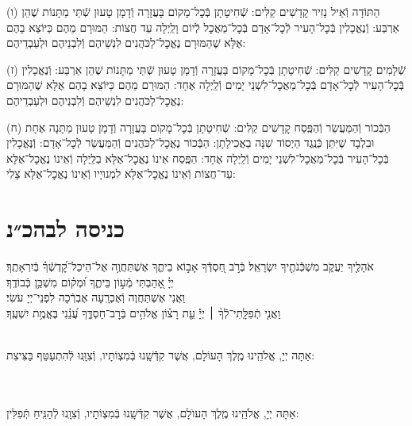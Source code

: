 \documentclass[twoside, openany, parskip=half, 11pt]{book}
\begin{document}
(ו) הַתּוֹדָה וְֿאֵיל נָזִיר קׇדָשִׁים קַלִּים: שְֿׁחִיטָתָן בְּֿכׇל־מָקוֹם בָּעֲזָרָה וְֿדָמָן טָעוּן שְֿׁתֵּי מַתָּנוֹת שֶׁהֵן אַרְבַּע: וְֿנֶאֱכָלִין בְּֿכׇל־הָעִיר לְֿכׇל־אָדָם בְּֿכׇל־מַאֲכׇל לְֿיוֹם וָלַֽיְלָה עַד חֲצוֹת: הַמּוּרָם מֵהֶם כַּיּוֹצֵא בָהֶם אֶלָּא שֶׁהַמּוּרָם נֶאֱכׇל־לַכֹּהֲנִים לִנְשֵׁיהֶם וְֿלִבְנֵיהֶם וּלְעַבְדֵיהֶם:

(ז) שְֿׁלָמִים קׇדָשִׁים קַלִּים: שְֿׁחִיטָתָן בְּֿכׇל־מָקוֹם בָּעֲזָרָה וְֿדָמָן טָעוּן שְֿׁתֵּי מַתָּנוֹת שֶׁהֵן אַרְבַּע: וְֿנֶאֱכָלִין בְּֿכׇל־הָעִיר לְֿכׇל־אָדָם בְּֿכׇל־מַאֲכׇל־לִשְׁנֵי יָמִים וְֿלַֽיְלָה אֶחָד: הַמּוּרָם מֵהֶם כַּיּוֹצֵא בָהֶם אֶלָּא שֶׁהַמּוּרָם נֶאֱכׇל־לַכֹּהֲנִים לִנְשֵׁיהֶם וְֿלִבְנֵיהֶם וּלְעַבְדֵיהֶם:

(ח) הַבְּֿכוֹר וְֿהַמַּעֲשֵׂר וְֿהַפֶּֽסַח קׇדָשִׁים קַלִּים: שְֿׁחִיטָתָן בְּֿכׇל־מָקוֹם בָּעֲזָרָה וְֿדָמָן טָעוּן מַתָּנָה אֶחָת וּבִלְבָד שֶׁיִּתֵּן כְּֿנֶֽגֶד הַיְסוֹד שִׁנָּה בַאֲכִילָתָן: הַבְּֿכוֹר נֶאֱכׇל־לַכֹּהֲנִים וְֿהַמַּעֲשֵׂר לְֿכׇל־אָדָם: וְֿנֶּאֱכָלִין בְּֿכׇל־הָעִיר בְּֿכׇל־מַאֲכׇל־לִשְׁנֵי יָמִים וְֿלַֽיְלָה אֶחָד: הַפֶּֽסַח אֵינוֹ נֶאֱכׇל־אֶלָּא בַלַּֽיְלָה וְֿאֵינוֹ נֶאֱכׇל־אֶלָּא עַד־חֲצוֹת וְֿאֵינוֹ נֶאֱכׇל־אֶלָּא לִמְנוּיָיו וְֿאֵינוֹ נֶאֱכׇל־אֶלָּא צָלִי:\\


\section[כניסה לבהכ״נ]{ כניסה לבהכ״נ }
אֹהָלֶ֖יךָ יַעֲקֹ֑ב מִשְׁכְּֿֿנֹתֶ֖יךָ יִשְׂרָאֵֽל׃
בְּֿרֹ֣ב חַ֭סְדְּֿֿךָ אָב֣וֹא בֵיתֶ֑ךָ אֶשְׁתַּחֲוֶ֥ה אֶל־הֵיכַל־קׇ֝דְשְֿׁךָ֗ בְּֿיִרְאָתֶֽךָ׃\\
יְיָ֗ אָ֭הַבְתִּי מְֿע֣וֹן בֵּיתֶ֑ךָ וּ֝מְק֗וֹם מִשְׁכַּ֥ן כְּֿבוֹדֶֽךָ׃ \\
וַאֲנִי אֶשְׁתַּחֲוֶה וְֿאֶכְרָֽעָה אֶבְרְֿכָה לִפְנֵי־יְיָ עֹשִׂי׃\\
וַאֲנִ֤י
%
תְֿפִלָּֽתִי־לְֿֿךָ֨ ׀ יְיָ֡ עֵ֤ת רָצ֗וֹן אֱלֹהִ֥ים בְּֿרׇב־חַסְדֶּ֑ךָ עֲ֝נֵ֗נִי בֶּאֱמֶ֥ת יִשְׁעֶֽךָ׃

\\
אַתָּה יְיָ, אֱלֹהֵֽינוּ מֶֽלֶךְ הָעוֹלָם, אֲשֶׁר קִדְּֿֿשָֽׁנוּ בְּֿמִצְוֹתָיו, וְֿצִוָּֽנוּ לְֿהִתְעַטֵּף בַּצִּיצִת:


\\
\\
אַתָּה יְיָ, אֱלֹהֵֽינוּ מֶֽלֶךְ הָעוֺלָם, אֲשֶׁר קִדְּֿֿשָֽׁנוּ בְּֿמִצְוֹתָיו, וְֿצִוָֽנוּ לְֿהַנִּֽיחַ תְּֿפִלִּין:
\end{document}
